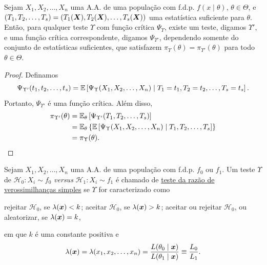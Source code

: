 \begin{theorem}
Sejam $X_1,X_2,\ldots,X_n$ uma A.A. de uma população com f.d.p. $f(x\mid\theta)$, $\theta\in\Theta$, e $(T_1,T_2,\ldots,T_s)=(T_1(\bm{X}),T_2(\bm{X}),\ldots,T_s(\bm{X}))$ uma estatística suficiente para $\theta$. Então, para qualquer teste $\Upsilon$ com função crítica $\Psi_\Upsilon$, existe um teste, digamos $\Upsilon'$, e uma função crítica correspondente, digamos $\Psi_{\Upsilon'}$, dependendo somente do conjunto de estatísticas suficientes, que satisfazem $\pi_\Upsilon(\theta)=\pi_{\Upsilon'}(\theta)$ para todo $\theta\in\Theta$.
\end{theorem}
\begin{proof}
Definamos
\begin{equation}
\Psi_{\Upsilon'}(t_1,t_2,\ldots,t_s)=\operatorname{\mathbb{E}}\left[\Psi_\Upsilon(X_1,X_2,\ldots,X_n)\mid T_1=t_1,T_2=t_2,\ldots,T_s=t_s\right].
\end{equation}
Portanto, $\Psi_{\Upsilon'}$ é uma função crítica. Além disso,
\begin{align}
\pi_{\Upsilon'}(\theta) &= \operatorname{\mathbb{E}}_\theta\left[\Psi_{\Upsilon'}(T_1,T_2,\ldots,T_s)\right]\notag\\
&= \operatorname{\mathbb{E}}_\theta\left\{\operatorname{\mathbb{E}}\left[\Psi_\Upsilon(X_1,X_2,\ldots,X_n)\mid T_1,T_2,\ldots,T_s\right]\right\}\notag\\
&= \pi_\Upsilon(\theta).
\end{align}
\end{proof}

\begin{definition}
Sejam $X_1,X_2,\ldots,X_n$ uma A.A. de uma população com f.d.p. $f_0$ ou $f_1$. Um teste $\Upsilon$ de $\mathcal{H}_0:X_i\sim f_0$ \emph{versus} $\mathcal{H}_1:X_i\sim f_1$ é chamado de \uline{teste da razão de verossimilhanças simples} se $\Upsilon$ for caracterizado como
\begin{outline}
\1 rejeitar $\mathcal{H}_0$, se $\lambda(\bm{x})<k$;
\1 aceitar $\mathcal{H}_0$, se $\lambda(\bm{x})>k$;
\1 aceitar ou rejeitar $\mathcal{H}_0$, ou aleatorizar, se $\lambda(\bm{x})=k$,
\end{outline}
em que $k$ é uma constante positiva e
\begin{equation}
\lambda(\bm{x})=\lambda(x_1,x_2,\ldots,x_n)=\frac{L(\theta_0\mid\bm{x})}{L(\theta_1\mid\bm{x})}\equiv\frac{L_0}{L_1}.
\end{equation}
\end{definition}

